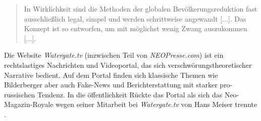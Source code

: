 \begin{quotation}
    In Wirklichkeit sind die Methoden der globalen Bevölkerungsreduktion fast ausschließlich legal, simpel und werden schrittweise angewandt [...]. Das Konzept ist so entworfen, um mit möglichst wenig Zwang auszukommen [...]. \parencite{recentr-population}
\end{quotation} 

Die Website \textit{Watergate.tv} (inzwischen Teil von \textit{NEOPresse.com}) ist ein rechtslastiges Nachrichten und Videoportal, das sich verschwörungstheoretischer Narrative bedient. 
Auf dem Portal finden sich klassische Themen wie Bilderberger \parencite[vgl.][]{watergate-bilderberger} aber auch Fake-News und Berichterstattung mit starker pro-russischen Tendenz.
In die öffentlichkeit Rückte das Portal als sich das Neo-Magazin-Royale wegen seiner Mitarbeit bei \textit{Watergate.tv} von Hans Meiser trennte \parencite*[Siehe z.B.][]{spiegel-watergate}.


